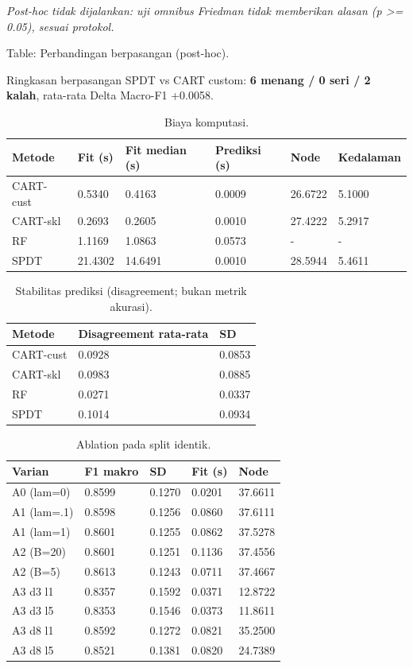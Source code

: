 \documentclass[
  conference]{IEEEtran}
\begin{document}
\emph{Post-hoc tidak dijalankan: uji omnibus Friedman tidak memberikan
alasan (p \textgreater= 0.05), sesuai protokol.}

Table: Perbandingan berpasangan (post-hoc).

Ringkasan berpasangan SPDT vs CART custom: \textbf{6 menang / 0 seri / 2
kalah}, rata-rata Delta Macro-F1 +0.0058.

\begin{table}[!t]
\centering
\caption{Biaya komputasi.}
\begin{tabular}{@{}llllll@{}}
\toprule\noalign{}
Metode & Fit (s) & Fit median (s) & Prediksi (s) & Node & Kedalaman \\
\midrule\noalign{}
\bottomrule\noalign{}
CART-cust & 0.5340 & 0.4163 & 0.0009 & 26.6722 & 5.1000 \\
CART-skl & 0.2693 & 0.2605 & 0.0010 & 27.4222 & 5.2917 \\
RF & 1.1169 & 1.0863 & 0.0573 & - & - \\
SPDT & 21.4302 & 14.6491 & 0.0010 & 28.5944 & 5.4611 \\
\end{tabular}
\end{table}

\begin{table}[!tb]
\centering
\caption{Stabilitas prediksi (disagreement; bukan metrik akurasi).}
\begin{tabular}{@{}lll@{}}
\toprule\noalign{}
Metode & Disagreement rata-rata & SD \\
\midrule\noalign{}
\bottomrule\noalign{}
CART-cust & 0.0928 & 0.0853 \\
CART-skl & 0.0983 & 0.0885 \\
RF & 0.0271 & 0.0337 \\
SPDT & 0.1014 & 0.0934 \\
\end{tabular}
\end{table}

\begin{table}[!tb]
\centering
\caption{Ablation pada split identik.}
\begin{tabular}{@{}lllll@{}}
\toprule\noalign{}
Varian & F1 makro & SD & Fit (s) & Node \\
\midrule\noalign{}
\bottomrule\noalign{}
A0 (lam=0) & 0.8599 & 0.1270 & 0.0201 & 37.6611 \\
A1 (lam=.1) & 0.8598 & 0.1256 & 0.0860 & 37.6111 \\
A1 (lam=1) & 0.8601 & 0.1255 & 0.0862 & 37.5278 \\
A2 (B=20) & 0.8601 & 0.1251 & 0.1136 & 37.4556 \\
A2 (B=5) & 0.8613 & 0.1243 & 0.0711 & 37.4667 \\
A3 d3 l1 & 0.8357 & 0.1592 & 0.0371 & 12.8722 \\
A3 d3 l5 & 0.8353 & 0.1546 & 0.0373 & 11.8611 \\
A3 d8 l1 & 0.8592 & 0.1272 & 0.0821 & 35.2500 \\
A3 d8 l5 & 0.8521 & 0.1381 & 0.0820 & 24.7389 \\
\end{tabular}
\end{table}
\end{document}
